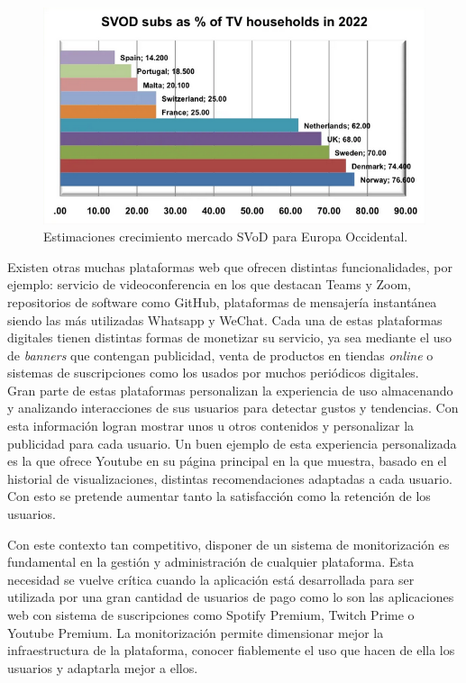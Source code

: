 \documentclass[a4paper, 12pt]{book}
\begin{document}
		\begin{figure}[H]
			\centering
			\includegraphics[width=12cm, keepaspectratio]{img/SVoD.png}
			\caption{Estimaciones crecimiento mercado SVoD para Europa Occidental.}
			\label{fig:svod}
		\end{figure}
		
		
		Existen otras muchas plataformas web que ofrecen distintas funcionalidades, por ejemplo: servicio de videoconferencia  en los que destacan Teams y Zoom, repositorios de software como GitHub, plataformas de mensajería instantánea siendo las más utilizadas Whatsapp y WeChat. Cada una de estas plataformas digitales tienen distintas formas de monetizar su servicio, ya sea mediante el uso de \textit{banners} que contengan publicidad, venta de productos en tiendas \textit{online} o sistemas de suscripciones como los usados por muchos periódicos digitales. \\
		
		Gran parte de estas plataformas personalizan la experiencia de uso almacenando y analizando interacciones de sus usuarios para detectar gustos y tendencias. Con esta información logran mostrar unos u otros contenidos y personalizar la publicidad para cada usuario. Un buen ejemplo de esta experiencia personalizada es la que ofrece Youtube en su página principal en la que muestra, basado en el historial de visualizaciones, distintas recomendaciones adaptadas a cada usuario. Con esto se pretende aumentar tanto la satisfacción como la retención de los usuarios.
		
		Con este contexto tan competitivo, disponer de un sistema de monitorización es fundamental en la gestión y administración de cualquier plataforma. Esta necesidad se vuelve crítica cuando la aplicación está desarrollada para ser utilizada por una gran cantidad de usuarios de pago como lo son las aplicaciones web con sistema de suscripciones como Spotify Premium, Twitch Prime o Youtube Premium. La monitorización permite dimensionar mejor la infraestructura de la plataforma, conocer fiablemente el uso que hacen de ella los usuarios y adaptarla mejor a ellos. \\
		
\end{document}
